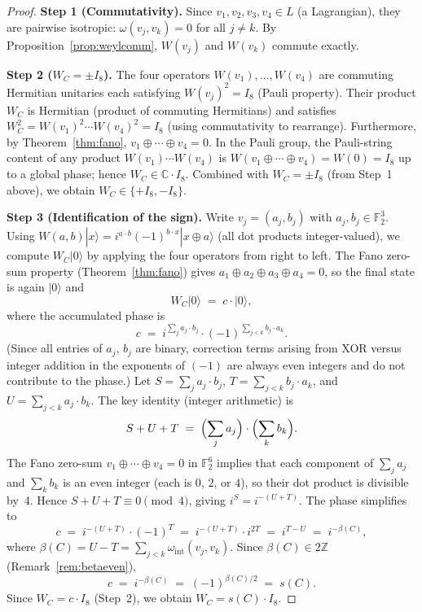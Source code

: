 \documentclass[11pt,a4paper]{article}
\theoremstyle{remark}
\begin{document}
\begin{proof}
\textbf{Step 1 (Commutativity).}
Since $v_1, v_2, v_3, v_4 \in L$ (a Lagrangian), they are pairwise
isotropic: $\omega(v_j, v_k) = 0$ for all $j \neq k$.
By Proposition~\ref{prop:weylcomm}, $W(v_j)$ and $W(v_k)$ commute exactly.

\textbf{Step 2 ($W_C = \pm I_8$).}
The four operators $W(v_1), \ldots, W(v_4)$ are commuting Hermitian unitaries
each satisfying $W(v_j)^2 = I_8$ (Pauli property).
Their product $W_C$ is Hermitian (product of commuting Hermitians)
and satisfies $W_C^2 = W(v_1)^2 \cdots W(v_4)^2 = I_8$ (using commutativity
to rearrange).
Furthermore, by Theorem~\ref{thm:fano}, $v_1 \oplus \cdots \oplus v_4 = 0$.
In the Pauli group, the Pauli-string content of any product
$W(v_1) \cdots W(v_4)$ is $W(v_1 \oplus \cdots \oplus v_4) = W(0) = I_8$
up to a global phase; hence $W_C \in \mathbb{C} \cdot I_8$.
Combined with $W_C = \pm I_8$ (from Step~1 above), we obtain $W_C \in \{+I_8, -I_8\}$.

\textbf{Step 3 (Identification of the sign).}
Write $v_j = (a_j, b_j)$ with $a_j, b_j \in \mathbb{F}_2^3$.
Using $W(a,b)|x\rangle = i^{a \cdot b}(-1)^{b \cdot x}|x \oplus a\rangle$
(all dot products integer-valued), we compute $W_C|0\rangle$
by applying the four operators from right to left.
The Fano zero-sum property (Theorem~\ref{thm:fano}) gives
$a_1 \oplus a_2 \oplus a_3 \oplus a_4 = 0$, so the final state
is again $|0\rangle$ and
\[
  W_C |0\rangle \;=\; c \cdot |0\rangle,
\]
where the accumulated phase is
\[
  c \;=\; i^{\sum_j a_j \cdot b_j} \cdot (-1)^{\sum_{j<k} b_j \cdot a_k}.
\]
(Since all entries of $a_j$, $b_j$ are binary, correction terms
arising from XOR versus integer addition in the exponents of $(-1)$
are always even integers and do not contribute to the phase.)
Let $S = \sum_j a_j \cdot b_j$, $T = \sum_{j<k} b_j \cdot a_k$,
and $U = \sum_{j<k} a_j \cdot b_k$.
The key identity (integer arithmetic) is
\[
  S + U + T \;=\; \Bigl(\sum_j a_j\Bigr) \cdot \Bigl(\sum_k b_k\Bigr).
\]
The Fano zero-sum $v_1 \oplus \cdots \oplus v_4 = 0$ in $\mathbb{F}_2^6$
implies that each component of $\sum_j a_j$ and $\sum_k b_k$ is an
even integer (each is $0$, $2$, or $4$), so their dot product is
divisible by~4.
Hence $S + U + T \equiv 0 \pmod 4$, giving $i^S = i^{-(U+T)}$.
The phase simplifies to
\[
  c \;=\; i^{-(U+T)} \cdot (-1)^T
  \;=\; i^{-(U+T)} \cdot i^{2T}
  \;=\; i^{T-U}
  \;=\; i^{-\beta(C)},
\]
where $\beta(C) = U - T = \sum_{j<k} \omega_{\mathrm{int}}(v_j, v_k)$.
Since $\beta(C) \in 2\mathbb{Z}$ (Remark~\ref{rem:betaeven}),
\[
  c \;=\; i^{-\beta(C)} \;=\; (-1)^{\beta(C)/2} \;=\; s(C).
\]
Since $W_C = c \cdot I_8$ (Step~2), we obtain $W_C = s(C) \cdot I_8$.
\end{proof}
\end{document}
